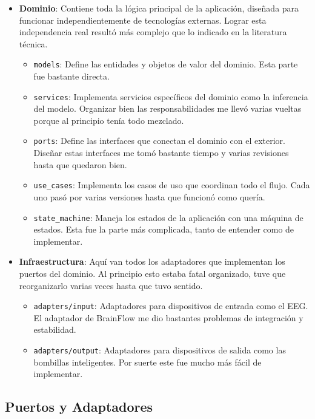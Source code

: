\begin{itemize}
    \item \textbf{Dominio}: Contiene toda la lógica principal de la aplicación, diseñada para funcionar independientemente de tecnologías externas. Lograr esta independencia real resultó más complejo que lo indicado en la literatura técnica.
    \begin{itemize}
        \item \texttt{models}: Define las entidades y objetos de valor del dominio. Esta parte fue bastante directa.
        \item \texttt{services}: Implementa servicios específicos del dominio como la inferencia del modelo. Organizar bien las responsabilidades me llevó varias vueltas porque al principio tenía todo mezclado.
        \item \texttt{ports}: Define las interfaces que conectan el dominio con el exterior. Diseñar estas interfaces me tomó bastante tiempo y varias revisiones hasta que quedaron bien.
        \item \texttt{use\_cases}: Implementa los casos de uso que coordinan todo el flujo. Cada uno pasó por varias versiones hasta que funcionó como quería.
        \item \texttt{state\_machine}: Maneja los estados de la aplicación con una máquina de estados. Esta fue la parte más complicada, tanto de entender como de implementar.
    \end{itemize}
    
    \item \textbf{Infraestructura}: Aquí van todos los adaptadores que implementan los puertos del dominio. Al principio esto estaba fatal organizado, tuve que reorganizarlo varias veces hasta que tuvo sentido.
    \begin{itemize}
        \item \texttt{adapters/input}: Adaptadores para dispositivos de entrada como el EEG. El adaptador de BrainFlow me dio bastantes problemas de integración y estabilidad.
        \item \texttt{adapters/output}: Adaptadores para dispositivos de salida como las bombillas inteligentes. Por suerte este fue mucho más fácil de implementar.
    \end{itemize}
\end{itemize}

\subsection{Puertos y Adaptadores}

